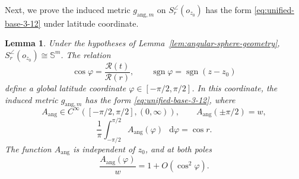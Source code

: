 \documentclass[11pt,reqno]{amsart}
\newtheorem{lemma}[theorem]{Lemma}
\theoremstyle{definition}
\numberwithin{equation}{section}
\DeclareMathOperator{\sgn}{sgn}
\newcommand{\dd}{\mathop{}\!\mathrm d}
\begin{document}
Next, we prove the induced metric $g_{\mathrm{ang},m}$ on \(S_r^{\angle}(o_{z_0})\) has the form \eqref{eq:unified-base-3-12} under latitude coordinate.
\begin{lemma}
\label{lem:angular-latitude-form}
Under the hypotheses of
Lemma~\ref{lem:angular-sphere-geometry},
\(S_r^{\angle}(o_{z_0})\cong\mathbb S^m\).  The relation
\begin{equation}\label{eq:latitude-form}
\cos\varphi=\frac{\mathcal R(t)}{\mathcal R(r)},\qquad
 \sgn\varphi=\sgn(z-z_0)
\end{equation}
define a global latitude coordinate
\(\varphi\in[-\pi/2,\pi/2]\).  In this coordinate, the induced metric $g_{\mathrm{ang},m}$
has the form \eqref{eq:unified-base-3-12}, where
\[
 A_{\mathrm{ang}}\in
 C^\infty([-\pi/2,\pi/2],(0,\infty)),\qquad
 A_{\mathrm{ang}}(\pm\pi/2)=w,
\]
\[
 \frac1\pi\int_{-\pi/2}^{\pi/2}
 A_{\mathrm{ang}}(\varphi)\,\dd\varphi=\cos r .
\]
The function \(A_{\mathrm{ang}}\) is independent of \(z_0\), and at
both poles
\begin{equation}\label{eq:pole expansion}
\frac{A_{\mathrm{ang}}(\varphi)}w
      =1+O(\cos^2\varphi).
\end{equation}

\end{lemma}
\end{document}

